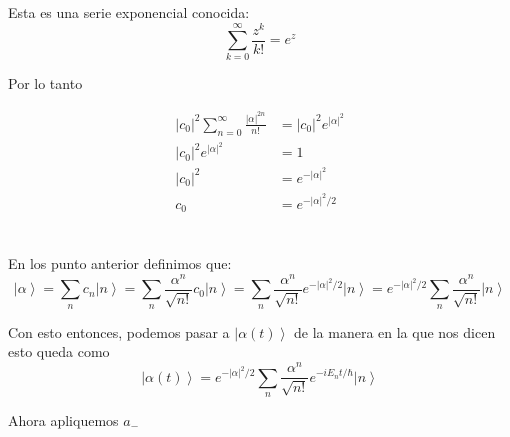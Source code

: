 \documentclass{report}
\begin{document}
Esta es una serie exponencial conocida:
\[
  \sum_{k = 0}^\infty \frac{z^k}{k!} = e^z
\]

Por lo tanto

\begin{align*}
  \left|c_0\right|^2 \sum_{n = 0}^{\infty} \frac{\left|\alpha\right|^{2n}}{n!} &= \left|c_0\right|^2 e^{\left|\alpha\right|^2}\\
  \left|c_0\right|^2 e^{\left|\alpha\right|^2} &= 1\\
  \left|c_0\right|^2 &= e^{-\left|\alpha\right|^2}\\
  c_0 &= e^{-\left|\alpha\right|^2/2}
\end{align*}

\pagebreak

\section{}

En los punto anterior definimos que:
\begin{equation*}
  \left| \alpha \right> = \sum_{n} c_n \left| n \right> = \sum_{n} \frac{\alpha^n}{\sqrt{n!}} c_0 \left| n \right> = \sum_{n} \frac{\alpha^n}{\sqrt{n!}} e^{-\left|\alpha\right|^2/2} \left| n \right> = e^{-\left|\alpha\right|^2/2} \sum_{n} \frac{\alpha^n}{\sqrt{n!}}  \left| n \right>
\end{equation*}

Con esto entonces, podemos pasar a $\left| \alpha (t) \right>$ de la manera en la que nos dicen esto queda como
\begin{equation*}
  \left| \alpha(t) \right> = e^{-\left|\alpha\right|^2/2} \sum_{n} \frac{\alpha^n}{\sqrt{n!}}  e^{-i E_n t/ \hbar}\left| n \right>
\end{equation*}

Ahora apliquemos $a_-$
\end{document}
